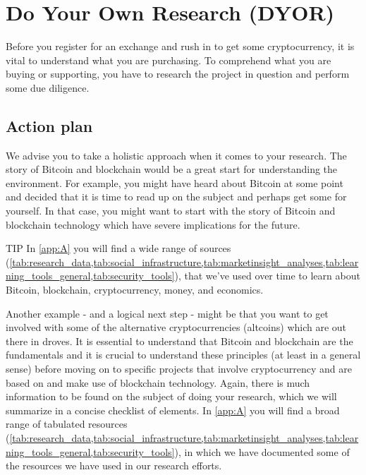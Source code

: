 \chapter{Do Your Own Research (DYOR)}
\label{ch:research}

Before you register for an exchange and rush in to get some cryptocurrency, it is vital to understand what you are purchasing. To comprehend what you are buying or supporting, you have to research the project in question and perform some due diligence.\medskip


\section{Action plan}
We advise you to take a holistic approach when it comes to your research. The story of Bitcoin and blockchain would be a great start for understanding the environment. For example, you might have heard about Bitcoin at some point and decided that it is time to read up on the subject and perhaps get some for yourself. In that case, you might want to start with the story of Bitcoin and blockchain technology which have severe implications for the future.

    \bigskip
    \begin{tipbox}{TIP}
    In \cref{app:A} you will find a wide range of sources (\cref{tab:research_data,tab:social_infrastructure,tab:marketinsight_analyses,tab:learning_tools_general,tab:security_tools}), that we've used over time to learn about Bitcoin, blockchain, cryptocurrency, money, and economics.
    \end{tipbox}
    \bigskip

Another example - and a logical next step - might be that you want to get involved with some of the alternative cryptocurrencies (altcoins) which are out there in droves. It is essential to understand that Bitcoin and blockchain are the fundamentals and it is crucial to understand these principles (at least in a general sense) before moving on to specific projects that involve cryptocurrency and are based on and make use of blockchain technology. Again, there is much information to be found on the subject of doing your research, which we will summarize in a concise checklist of elements. In \cref{app:A} you will find a broad range of tabulated resources (\cref{tab:research_data,tab:social_infrastructure,tab:marketinsight_analyses,tab:learning_tools_general,tab:security_tools}), in which we have documented some of the resources we have used in our research efforts. 

